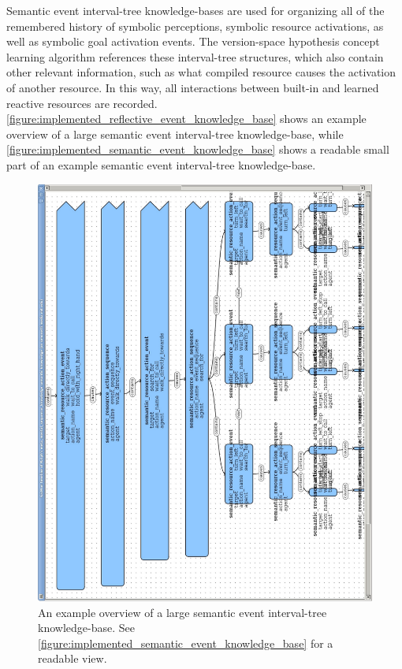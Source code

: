 Semantic event interval-tree knowledge-bases are used for organizing
all of the remembered history of symbolic perceptions, symbolic
resource activations, as well as symbolic goal activation events.  The
version-space hypothesis concept learning algorithm
{\mbox{\cite[]{mitchell:1997}}} references these interval-tree
structures, which also contain other relevant information, such as
what compiled resource causes the activation of another resource.  In
this way, all interactions between built-in and learned reactive
resources are recorded.
{\mbox{\autoref{figure:implemented_reflective_event_knowledge_base}}}
shows an example overview of a large semantic event interval-tree
knowledge-base, while
{\mbox{\autoref{figure:implemented_semantic_event_knowledge_base}}}
shows a readable small part of an example semantic event interval-tree
knowledge-base.
\begin{figure}
\begin{center}
\hspace*{-2cm}\includegraphics[width=13cm]{gfx/implemented_reflective_event_knowledge_base}
\end{center}
\caption[An example overview of a large semantic event interval-tree
  knowledge-base.]{An example overview of a large semantic event
  interval-tree knowledge-base.  See
  {\mbox{\autoref{figure:implemented_semantic_event_knowledge_base}}}
  for a readable view.}
\label{figure:implemented_reflective_event_knowledge_base}
\end{figure}
